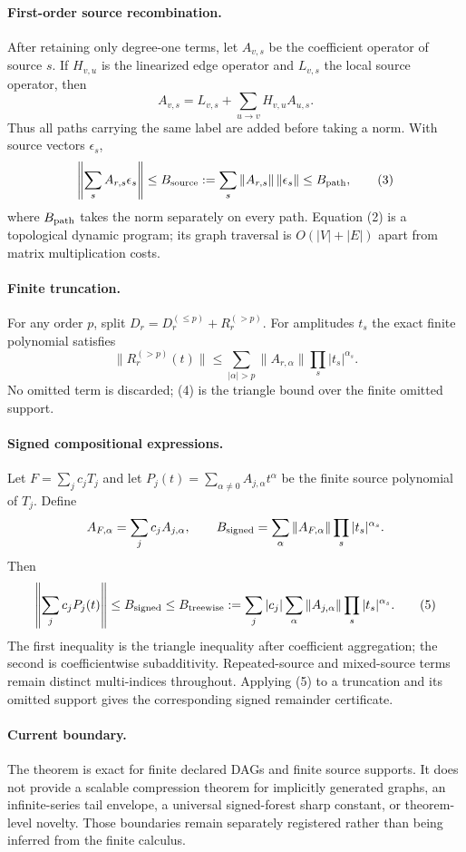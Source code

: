 \paragraph{First-order source recombination.}
After retaining only degree-one terms, let $A_{v,s}$ be the coefficient
operator of source $s$.  If $H_{v,u}$ is the linearized edge operator and
$L_{v,s}$ the local source operator, then
\[
 A_{v,s}=L_{v,s}+\sum_{u\to v}H_{v,u}A_{u,s}.
\tag{2}
\]
Thus all paths carrying the same label are added before taking a norm.  With
source vectors $\epsilon_s$,
\[
 \left\|\sum_s A_{r,s}\epsilon_s\right\|
 \le B_{\rm source}:=\sum_s\|A_{r,s}\|\,\|\epsilon_s\|
 \le B_{\rm path},
\tag{3}
\]
where $B_{\rm path}$ takes the norm separately on every path.  Equation (2)
is a topological dynamic program; its graph traversal is $O(|V|+|E|)$ apart
from matrix multiplication costs.

\paragraph{Finite truncation.}
For any order $p$, split $D_r=D_r^{(\le p)}+R_r^{(>p)}$.  For amplitudes
$t_s$ the exact finite polynomial satisfies
\[
 \|R_r^{(>p)}(t)\|
 \le \sum_{|\alpha|>p}\|A_{r,\alpha}\|
                 \prod_s|t_s|^{\alpha_s}.
\tag{4}
\]
No omitted term is discarded; (4) is the triangle bound over the finite
omitted support.

\paragraph{Signed compositional expressions.}
Let $F=\sum_j c_jT_j$ and let
$P_j(t)=\sum_{\alpha\ne0}A_{j,\alpha}t^\alpha$ be the finite source
polynomial of $T_j$.  Define
\[
 A_{F,\alpha}=\sum_j c_jA_{j,\alpha},\qquad
 B_{\rm signed}=\sum_\alpha\|A_{F,\alpha}\|
                              \prod_s|t_s|^{\alpha_s}.
\]
Then
\[
 \left\|\sum_jc_jP_j(t)\right\|
 \le B_{\rm signed}
 \le B_{\rm treewise}:=
 \sum_j|c_j|\sum_\alpha\|A_{j,\alpha}\|
                              \prod_s|t_s|^{\alpha_s}.
\tag{5}
\]
The first inequality is the triangle inequality after coefficient
aggregation; the second is coefficientwise subadditivity.  Repeated-source
and mixed-source terms remain distinct multi-indices throughout.  Applying
(5) to a truncation and its omitted support gives the corresponding signed
remainder certificate.

\paragraph{Current boundary.}
The theorem is exact for finite declared DAGs and finite source supports.  It
does not provide a scalable compression theorem for implicitly generated
graphs, an infinite-series tail envelope, a universal signed-forest sharp
constant, or theorem-level novelty.  Those boundaries remain separately
registered rather than being inferred from the finite calculus.
